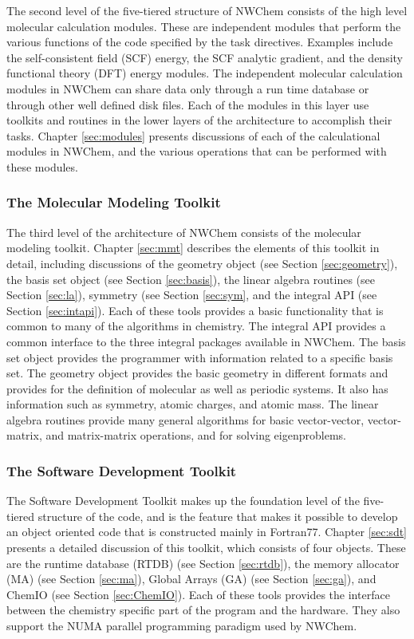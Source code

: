 The second level of the five-tiered structure of NWChem consists of
the high level molecular calculation modules.  These are independent 
modules that perform the various functions of the code specified by the
task directives.  Examples 
include the self-consistent field (SCF) energy, the
SCF analytic gradient, and the density functional theory (DFT) energy 
modules.  The independent molecular calculation modules in NWChem 
can share data only through 
a run time database or through other well defined disk files.  
Each of the modules in this layer use
toolkits and routines in the lower layers of the architecture to
accomplish their tasks.  Chapter \ref{sec:modules} presents discussions
of each of the calculational modules in NWChem, and the various operations
that can be performed with these modules.

\subsubsection{The Molecular Modeling Toolkit}

The third level of the architecture of NWChem consists of
the molecular modeling toolkit.  Chapter \ref{sec:mmt} describes the
elements of this toolkit in detail,  including discussions of 
the geometry object (see Section \ref{sec:geometry}), 
the basis set object (see Section \ref{sec:basis}), the
linear algebra routines (see Section \ref{sec:la}), 
symmetry (see Section \ref{sec:sym}, and
the integral API (see Section
\ref{sec:intapi}).  Each of these 
tools provides a basic functionality that is common to many of the
algorithms in chemistry.  The integral API provides a common interface to
the three integral packages available in NWChem.  The basis set object
provides the programmer with information related to a specific basis
set.  The geometry object provides the basic geometry in different
formats and provides for the definition of molecular as well as periodic
systems.  It also has information such as symmetry, atomic charges, and
atomic mass.  The linear algebra routines provide many general 
algorithms for basic vector-vector, vector-matrix, and matrix-matrix
operations, and for solving
eigenproblems.

\subsubsection{The Software Development Toolkit}

The Software Development Toolkit
makes up the foundation level of the five-tiered
structure of the code, and is the feature that makes it possible
to develop an object oriented code that is constructed mainly
in Fortran77.  Chapter \ref{sec:sdt} presents a detailed discussion
of this toolkit, which consists of four objects.
These are the runtime database (RTDB) (see Section
\ref{sec:rtdb}), the memory allocator (MA) (see Section \ref{sec:ma}),
Global Arrays (GA) (see Section \ref{sec:ga}), and ChemIO 
(see Section \ref{sec:ChemIO}).  Each of these tools provides the
interface between the chemistry specific part of the program and the
hardware.  They also support the NUMA parallel programming
paradigm used by NWChem.

